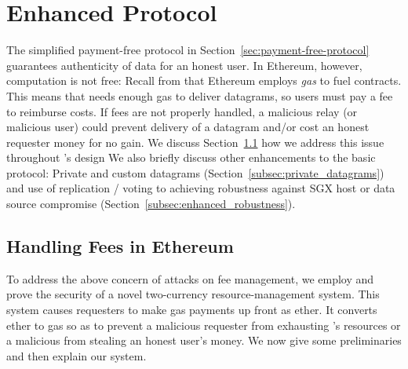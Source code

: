 
\section{Enhanced Protocol}
\label{sec:enhanced_protocol}

The simplified payment-free protocol in Section~\ref{sec:payment-free-protocol} guarantees authenticity of data for an honest user.
In Ethereum, however, computation is not free: Recall from that Ethereum employs \emph{gas} to fuel contracts. This means that \tc needs enough gas to deliver datagrams, so users must pay a fee to reimburse costs. If fees are not properly handled, a malicious relay (or malicious user) could prevent delivery of a datagram and/or cost an honest requester money for no gain. We discuss Section~\ref{sec:gas-protocol} how we address this issue throughout \tc's design We also briefly discuss other enhancements to the basic \tc protocol: Private and custom datagrams (Section~\ref{subsec:private_datagrams}) and use of replication / voting to achieving robustness against SGX host or data source compromise (Section~\ref{subsec:enhanced_robustness}).


\subsection{Handling Fees in Ethereum}
\label{sec:gas-protocol}


To address the above concern of attacks on \tc fee management, we employ and prove the security of a novel two-currency resource-management system. This system causes
requesters to make gas payments up front as ether. It converts ether to gas so as to prevent a malicious requester from exhausting \tc's resources
or a malicious \tc from stealing an honest user's money. We now give some preliminaries and then explain our system.


